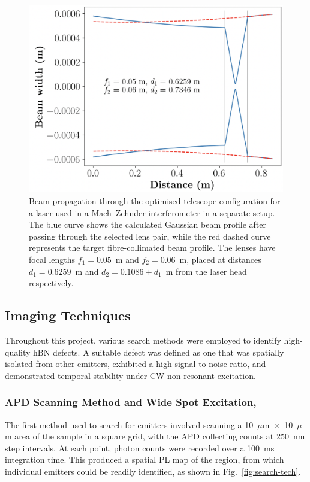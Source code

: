 \begin{figure}[h]
    \centering
    \includegraphics[width=0.9\linewidth]{Figures/OptimalTelescope.png}
    \caption{Beam propagation through the optimised telescope configuration for a laser used in a Mach–Zehnder interferometer in a separate setup. The blue curve shows the calculated Gaussian beam profile after passing through the selected lens pair, while the red dashed curve represents the target fibre-collimated beam profile. The lenses have focal lengths $f_1 = 0.05$~m and $f_2 = 0.06$~m, placed at distances $d_1 = 0.6259$~m and $d_2 = 0.1086+d_1$~m from the laser head respectively.}
    \label{fig:optimised-telescope}
\end{figure}


\subsection{Imaging Techniques}

Throughout this project, various search methods were employed to identify high-quality hBN defects. A suitable defect was defined as one that was spatially isolated from other emitters, exhibited a high signal-to-noise ratio, and demonstrated temporal stability under CW non-resonant excitation.

\subsubsection{APD Scanning Method and Wide Spot Excitation, \label{APD-scan}}

The first method used to search for emitters involved scanning a 10~$\mu$m~$\times$~10~$\mu$m area of the sample in a square grid, with the APD collecting counts at 250~nm step intervals. At each point, photon counts were recorded over a 100~ms integration time. This produced a spatial PL map of the region, from which individual emitters could be readily identified, as shown in Fig.~\ref{fig:search-tech}.

